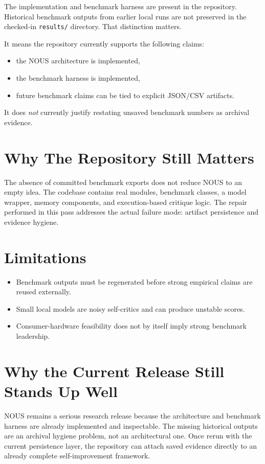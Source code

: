 \documentclass[conference]{IEEEtran}
\begin{document}
The implementation and benchmark harness are present in the repository.
Historical benchmark outputs from earlier local runs are not preserved in the
checked-in \texttt{results/} directory. That distinction matters.

It means the repository currently supports the following claims:
\begin{itemize}
  \item the NOUS architecture is implemented,
  \item the benchmark harness is implemented,
  \item future benchmark claims can be tied to explicit JSON/CSV artifacts.
\end{itemize}

It does \emph{not} currently justify restating unsaved benchmark numbers as
archival evidence.

\section{Why The Repository Still Matters}

The absence of committed benchmark exports does not reduce NOUS to an empty idea.
The codebase contains real modules, benchmark classes, a model wrapper, memory
components, and execution-based critique logic. The repair performed in this pass
addresses the actual failure mode: artifact persistence and evidence hygiene.

\section{Limitations}

\begin{itemize}
  \item Benchmark outputs must be regenerated before strong empirical claims are reused externally.
  \item Small local models are noisy self-critics and can produce unstable scores.
  \item Consumer-hardware feasibility does not by itself imply strong benchmark leadership.
\end{itemize}

\section{Why the Current Release Still Stands Up Well}
NOUS remains a serious research release because the architecture and benchmark
harness are already implemented and inspectable. The missing historical outputs
are an archival hygiene problem, not an architectural one. Once rerun with the
current persistence layer, the repository can attach saved evidence directly to
an already complete self-improvement framework.
\end{document}
